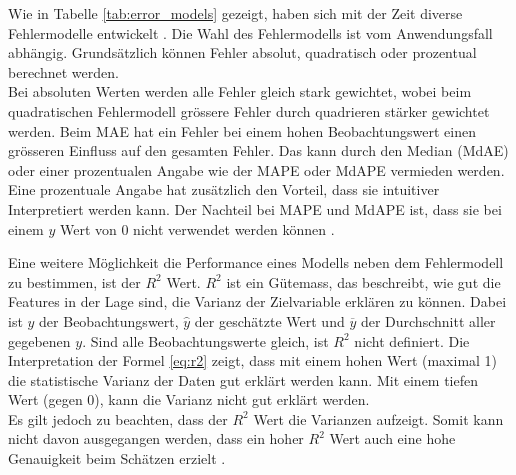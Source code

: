 \begin{table}[h]
\centering
{}
\caption{Fehlermodelle mit Formelen}
\label{tab:error_models}
\end{table}

Wie in Tabelle \ref{tab:error_models} gezeigt, haben sich mit der Zeit diverse Fehlermodelle entwickelt \cite{error_models}. Die Wahl des Fehlermodells ist vom Anwendungsfall abhängig. Grundsätzlich können Fehler absolut, quadratisch oder prozentual berechnet werden.\\
Bei absoluten Werten werden alle Fehler gleich stark gewichtet, wobei beim quadratischen Fehlermodell grössere Fehler durch quadrieren stärker gewichtet werden. Beim MAE hat ein Fehler bei einem hohen Beobachtungswert einen grösseren Einfluss auf den gesamten Fehler. Das kann durch den Median (MdAE) oder einer prozentualen Angabe wie der MAPE oder MdAPE vermieden werden. Eine prozentuale Angabe hat zusätzlich den Vorteil, dass sie intuitiver Interpretiert werden kann. Der Nachteil bei MAPE und MdAPE ist, dass sie bei einem $y$ Wert von 0 nicht verwendet werden können \cite{error_models_2}.

Eine weitere Möglichkeit die Performance eines Modells neben dem Fehlermodell zu bestimmen, ist der $R^2$ Wert. $R^2$ ist ein Gütemass, das beschreibt, wie gut die Features in der Lage sind, die Varianz der Zielvariable erklären zu können. Dabei ist $y$ der Beobachtungswert, $\hat{y}$ der geschätzte Wert und $\overline{y}$ der Durchschnitt aller gegebenen $y$. Sind alle Beobachtungswerte gleich, ist $R^2$ nicht definiert. Die Interpretation der Formel \eqref{eq:r2} zeigt, dass mit einem hohen Wert (maximal 1) die statistische Varianz der Daten gut erklärt werden kann. Mit einem tiefen Wert (gegen 0), kann die Varianz nicht gut erklärt werden. \\
Es gilt jedoch zu beachten, dass der $R^2$ Wert die Varianzen aufzeigt. Somit kann nicht davon ausgegangen werden, dass ein hoher $R^2$ Wert auch eine hohe Genauigkeit beim Schätzen erzielt \cite{r2, r2_2}.

